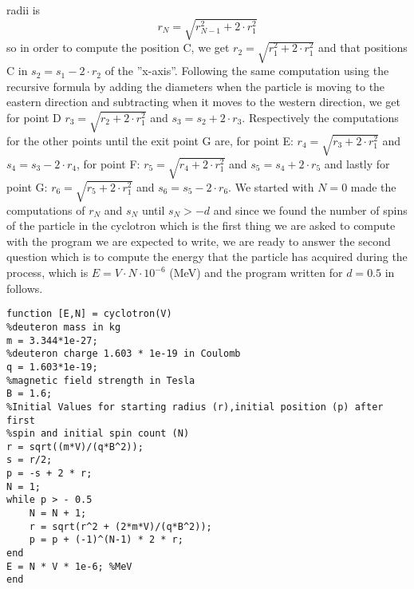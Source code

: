 \documentclass[10pt]{article}
\newcommand{\dsp}{\displaystyle}
\newcommand{\matlab}{\text{\color{red}matlab }}
\begin{document}
radii is \[
r_{N} = \sqrt{r_{N-1}^{2}+2\cdot r_{1}^{2}}
\]
so in order to compute the position C, we get $\dsp r_{2} = \sqrt{r_1^2+2\cdot r_1^2}$ and 
that positions C in $\dsp s_{2} = s_{1} - 2\cdot r_{2}$ of the ''x-axis''. Following 
the same computation using the recursive formula by adding the diameters when the particle is moving to the eastern direction and subtracting when it moves to the western direction, we get for point D $\dsp r_{3} = \sqrt{r_{2}+2\cdot r_{1}^2}$ and $\dsp s_{3} = s_{2} + 2\cdot r_{3}$. 
Respectively the computations for the other points until the exit point G are, for point 
E: $\dsp r_{4} = \sqrt{r_3 + 2\cdot r_{1}^2}$ and $s_{4} = s_{3} - 2\cdot r_4$, for point 
F: $\dsp r_{5} = \sqrt{r_4+2\cdot r_{1}^{2}}$ and $s_{5} = s_{4} + 2\cdot r_5$ and 
lastly for point G: $\dsp r_{6} = \sqrt{r_{5}+2\cdot r_{1}^{2}}$ and $s_{6} = 
s_{5}-2\cdot r_{6}$. We started with $N=0$ made the computations of $r_N$ and 
$s_N$ until $s_{N} > - d$ and since we found the number of spins of the particle in the 
cyclotron which is the first thing we are asked to compute with the program we are 
expected to write, we are ready to answer the second question which is to compute the 
energy that the particle has acquired during the process, which is $E = V\cdot N\cdot 
10^{-6}$ (MeV) and the program written for $d=0.5$ in \matlab follows.
\begin{lstlisting}
function [E,N] = cyclotron(V)
%deuteron mass in kg
m = 3.344*1e-27;
%deuteron charge 1.603 * 1e-19 in Coulomb
q = 1.603*1e-19;
%magnetic field strength in Tesla
B = 1.6;
%Initial Values for starting radius (r),initial position (p) after first
%spin and initial spin count (N)
r = sqrt((m*V)/(q*B^2));
s = r/2;
p = -s + 2 * r;
N = 1;
while p > - 0.5
    N = N + 1;
    r = sqrt(r^2 + (2*m*V)/(q*B^2));
    p = p + (-1)^(N-1) * 2 * r;
end
E = N * V * 1e-6; %MeV
end
\end{lstlisting}
\end{document}
